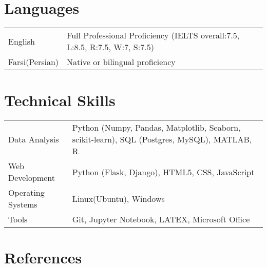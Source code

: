 \documentclass[a4paper,10pt]{article}
\begin{document}
\section{Languages}
\begin{tabularx}{\linewidth}{@{}l X@{}}
    English &  \normalsize{Full Professional Proficiency (IELTS overall:7.5, L:8.5, R:7.5, W:7, S:7.5)}\\
    Farsi(Persian) &  \normalsize{Native or bilingual proficiency}\\
    
\end{tabularx}

\section{Technical Skills}
\begin{tabularx}{\linewidth}{@{}l X@{}}
    Data Analysis &  \normalsize{Python (Numpy, Pandas, Matplotlib, Seaborn, scikit-learn), SQL (Postgres, MySQL), MATLAB, R}\\
    Web Development &  \normalsize{Python (Flask, Django), HTML5, CSS, JavaScript}\\
    Operating Systems &  \normalsize{Linux(Ubuntu), Windows}\\  
    Tools &  \normalsize{Git, Jupyter Notebook, LATEX, Microsoft Office}\\ 
    
\end{tabularx}




\section{References}
\end{document}
